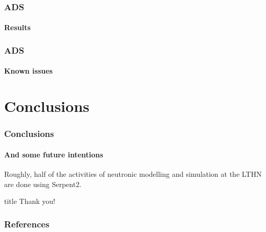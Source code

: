\documentclass[svgnames,smaller,table]{beamer}
\begin{document}
\begin{frame}
  \frametitle{ADS}
  \framesubtitle{Results}
\end{frame}

\begin{frame}
  \frametitle{ADS}
  \framesubtitle{Known issues}
\end{frame}


\section{Conclusions}
\begin{frame}
  \frametitle{Conclusions}
  \framesubtitle{And some future intentions}
  Roughly, half of the activities of neutronic modelling and simulation at the LTHN are done using Serpent2.
\end{frame}



\begin{frame}
 \vfill
  \begin{beamercolorbox}[center]{title}
     \Huge{Thank you!}
  \end{beamercolorbox}
  \vfill
\end{frame}

\begin{frame}
    \frametitle{References}
    
    
\end{frame}
\end{document}
